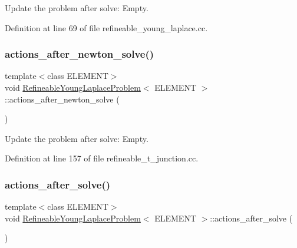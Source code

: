 Update the problem after solve\+: Empty. 



Definition at line 69 of file refineable\+\_\+young\+\_\+laplace.\+cc.

\mbox{\label{classRefineableYoungLaplaceProblem_a0791c90a16016372e09faf3f5721ecbe}} 
\subsubsection{\texorpdfstring{actions\+\_\+after\+\_\+newton\+\_\+solve()}{actions\_after\_newton\_solve()}\hspace{0.1cm}{\footnotesize\ttfamily [2/2]}}
{\footnotesize\ttfamily template$<$class E\+L\+E\+M\+E\+NT$>$ \\
void \hyperlink{classRefineableYoungLaplaceProblem}{Refineable\+Young\+Laplace\+Problem}$<$ E\+L\+E\+M\+E\+NT $>$\+::actions\+\_\+after\+\_\+newton\+\_\+solve (\begin{DoxyParamCaption}{ }\end{DoxyParamCaption})\hspace{0.3cm}{\ttfamily [inline]}}



Update the problem after solve\+: Empty. 



Definition at line 157 of file refineable\+\_\+t\+\_\+junction.\+cc.

\mbox{\label{classRefineableYoungLaplaceProblem_a5c472ae3361af18979085c824a47ab53}} 
\subsubsection{\texorpdfstring{actions\+\_\+after\+\_\+solve()}{actions\_after\_solve()}}
{\footnotesize\ttfamily template$<$class E\+L\+E\+M\+E\+NT$>$ \\
void \hyperlink{classRefineableYoungLaplaceProblem}{Refineable\+Young\+Laplace\+Problem}$<$ E\+L\+E\+M\+E\+NT $>$\+::actions\+\_\+after\+\_\+solve (\begin{DoxyParamCaption}{ }\end{DoxyParamCaption})\hspace{0.3cm}{\ttfamily [inline]}}



